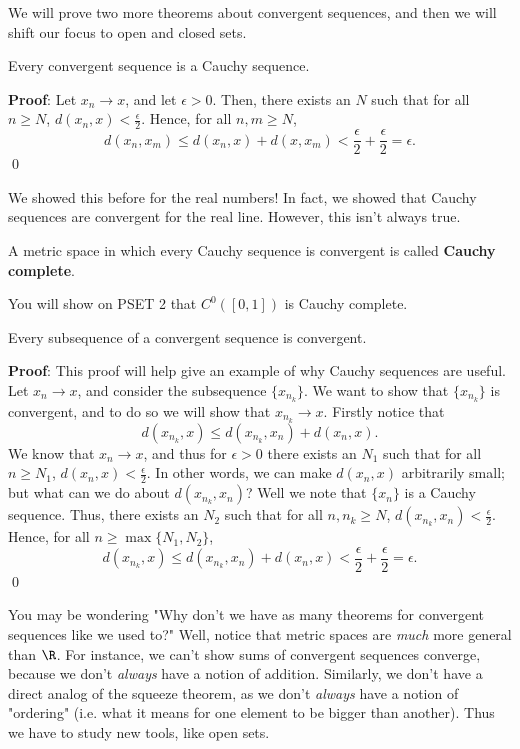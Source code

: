We will prove two more theorems about convergent sequences, and then we will shift our focus to open and closed sets.
\begin{proposition}
Every convergent sequence is a Cauchy sequence.
\end{proposition}
\textbf{Proof}: Let $x_n \to x$, and let $\epsilon>0$. Then, there exists an $N$ such that for all $n\geq N$, $d(x_n,x) < \frac{\epsilon}{2}$. Hence, for all $n,m\geq N$, 
\[
d(x_n,x_m) \leq d(x_n,x) + d(x,x_m) < \frac{\epsilon}{2} + \frac{\epsilon}{2} = \epsilon.
\]
\qed 

We showed this before for the real numbers! In fact, we showed that Cauchy sequences are convergent for the real line. However, this isn't always true.

\begin{definition}
    A metric space in which every Cauchy sequence is convergent is called \textbf{Cauchy complete}. 
\end{definition}

\begin{remark}
You will show on PSET 2 that $C^0([0,1])$ is Cauchy complete.
\end{remark}

\begin{proposition}
Every subsequence of a convergent sequence is convergent.
\end{proposition}
\textbf{Proof}: This proof will help give an example of why Cauchy sequences are useful. Let $x_n\to x$, and consider the subsequence $\{x_{n_k}\}$. We want to show that $\{x_{n_k}\}$ is convergent, and to do so we will show that $x_{n_k} \to x$. Firstly notice that 
\[
d(x_{n_k}, x) \leq d(x_{n_k},x_n) + d(x_n,x).
\]
We know that $x_n \to x$, and thus for $\epsilon>0$ there exists an $N_1$ such that for all $n\geq N_1$, $d(x_n,x) < \frac{\epsilon}{2}$. In other words, we can make $d(x_n,x)$ arbitrarily small; but what can we do about $d(x_{n_k},x_n)$? Well we note that $\{x_n\}$ is a Cauchy sequence. Thus, there exists an $N_2$ such that for all $n,n_k\geq N$, $d(x_{n_k}, x_n) < \frac{\epsilon}{2}$. Hence, for all $n\geq \max\{N_1, N_2\}$, 
\[
d(x_{n_k}, x) \leq d(x_{n_k},x_n) + d(x_n,x) < \frac{\epsilon}{2} + \frac{\epsilon}{2} = \epsilon.
\]
\qed 

You may be wondering "Why don't we have as many theorems for convergent sequences like we used to?" Well, notice that metric spaces are \textit{much} more general than $\R$. For instance, we can't show sums of convergent sequences converge, because we don't \textit{always} have a notion of addition. Similarly, we don't have a direct analog of the squeeze theorem, as we don't \textit{always} have a notion of "ordering" (i.e. what it means for one element to be bigger than another). Thus we have to study new tools, like open sets.

